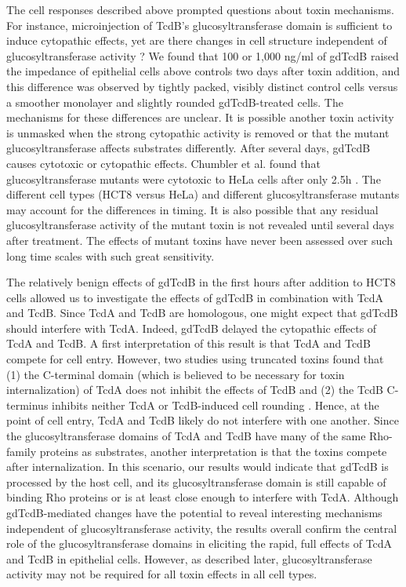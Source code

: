 The cell responses described above prompted questions about 
toxin mechanisms. For instance, microinjection of TcdB's 
glucosyltransferase domain is sufficient to induce 
cytopathic effects, yet are there changes in cell structure 
independent of glucosyltransferase activity \cite{Rupnik:2005dq}? We found 
that 100 or 1,000 ng/ml of gdTcdB raised the impedance of 
epithelial cells above controls two days after toxin 
addition, and this difference was observed by tightly 
packed, visibly distinct control cells versus a smoother 
monolayer and slightly rounded gdTcdB-treated cells. The 
mechanisms for these differences are unclear. It is possible 
another toxin activity is unmasked when the strong 
cytopathic activity is removed or that the mutant 
glucosyltransferase affects substrates differently. After 
several days, gdTcdB causes cytotoxic or cytopathic effects. 
Chumbler et al. found that glucosyltransferase mutants were 
cytotoxic to HeLa cells after only 2.5h \cite{Chumbler:2012co}. The different 
cell types (HCT8 versus HeLa) and different glucosyltransferase 
mutants may account for the differences in timing. It 
is also possible that any residual glucosyltransferase 
activity of the mutant toxin is not revealed until 
several days after treatment. The effects of mutant 
toxins have never been assessed over such long time 
scales with such great sensitivity.

The relatively benign effects of gdTcdB in the first 
hours after addition to HCT8 cells allowed us to 
investigate the effects of gdTcdB in combination with 
TcdA and TcdB. Since TcdA and TcdB are homologous, one 
might expect that gdTcdB should interfere with TcdA. 
Indeed, gdTcdB delayed the cytopathic effects of TcdA 
and TcdB. A first interpretation of this result is 
that TcdA and TcdB compete for cell entry. However, 
two studies using truncated toxins found that (1) 
the C-terminal domain (which is believed to be 
necessary for toxin internalization) of TcdA does 
not inhibit the effects of TcdB and (2) the TcdB 
C-terminus inhibits neither TcdA or TcdB-induced 
cell rounding \cite{Frisch:2003ul,Dingle:2008gu}. Hence, at the point of cell 
entry, TcdA and TcdB likely do not interfere with one 
another. Since the glucosyltransferase domains of TcdA 
and TcdB have many of the same Rho-family proteins as 
substrates, another interpretation is that the toxins 
compete after internalization. In this scenario, our 
results would indicate that gdTcdB is processed by 
the host cell, and its glucosyltransferase domain is 
still capable of binding Rho proteins or is at least 
close enough to interfere with TcdA. Although 
gdTcdB-mediated changes have the potential to reveal 
interesting mechanisms independent of glucosyltransferase 
activity, the results overall confirm the central 
role of the glucosyltransferase domains in eliciting 
the rapid, full effects of TcdA and TcdB in epithelial 
cells. However, as described later, glucosyltransferase 
activity may not be required for all toxin effects in 
all cell types.

